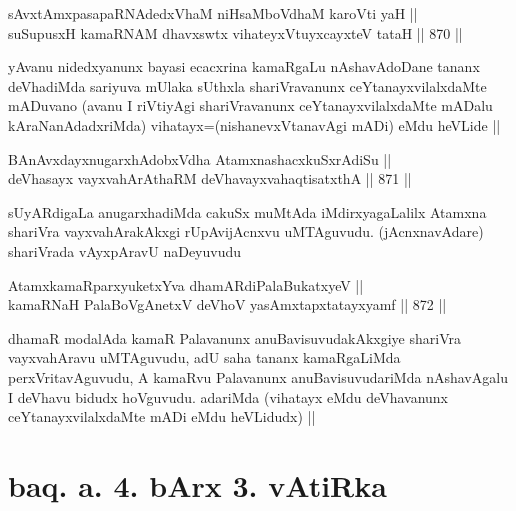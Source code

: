 
\begin{shl}
sAvxtAmxpasapaRNAdedxVhaM niHsaMboVdhaM karoVti yaH || \\
suSupusxH kamaRNAM dhavxswtx vihateyxVtuyxcayxteV tataH ||  870 ||  
\end{shl}

\begin{artha}
yAvanu nidedxyanunx bayasi ecacxrina kamaRgaLu nAshavAdoDane tananx deVhadiMda sariyuva mUlaka sUthxla shariVravanunx ceYtanayxvilalxdaMte mADuvano (avanu I riVtiyAgi shariVravanunx ceYtanayxvilalxdaMte mADalu kAraNanAdadxriMda) vihatayx=(nishanevxVtanavAgi mADi) eMdu heVLide ||
\end{artha}


\begin{shl}
BAnAvxdayxnugarxhAdobxVdha AtamxnashacxkuSxrAdiSu || \\
deVhasayx vayxvahArAthaRM deVhavayxvahaqtisatxthA ||  871 ||  
\end{shl}

\begin{artha}
sUyARdigaLa anugarxhadiMda cakuSx muMtAda iMdirxyagaLalilx Atamxna shariVra vayxvahArakAkxgi rUpAvijAcnxvu uMTAguvudu. (jAcnxnavAdare) shariVrada vAyxpAravU naDeyuvudu
\end{artha}


\begin{shl}
AtamxkamaRparxyuketxYva dhamARdiPalaBukatxyeV || \\
kamaRNaH PalaBoVgAnetxV deVhoV yasAmxtapxtatayxyamf ||  872 ||  
\end{shl}

\begin{artha}
dhamaR modalAda kamaR Palavanunx anuBavisuvudakAkxgiye shariVra vayxvahAravu uMTAguvudu, adU saha tananx kamaRgaLiMda perxVritavAguvudu, A kamaRvu Palavanunx anuBavisuvudariMda nAshavAgalu I deVhavu bidudx hoVguvudu. adariMda (vihatayx eMdu deVhavanunx ceYtanayxvilalxdaMte mADi eMdu heVLidudx) ||
\end{artha}

\section*{baq. a. 4. bArx 3. vAtiRka}

